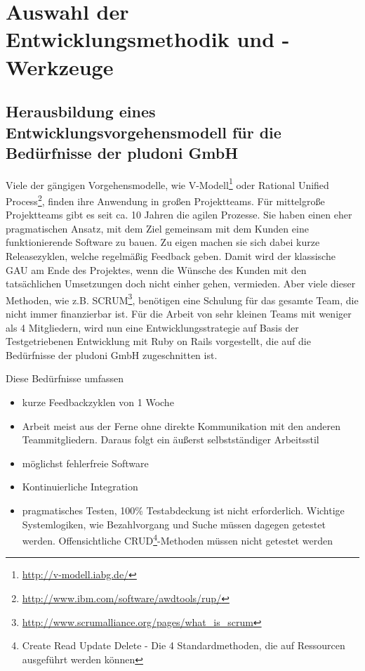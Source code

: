 \section{Auswahl der Entwicklungsmethodik und -Werkzeuge}
\subsection{Herausbildung eines Entwicklungsvorgehensmodell für die Bedürfnisse der pludoni GmbH}
Viele der gängigen Vorgehensmodelle, wie V-Modell\footnote{\url{http://v-modell.iabg.de/}} oder Rational Unified Process\footnote{\url{http://www.ibm.com/software/awdtools/rup/}}, finden ihre Anwendung in großen Projektteams. Für mittelgroße Projektteams gibt es seit ca. 10 Jahren die agilen Prozesse. Sie haben einen eher pragmatischen Ansatz, mit dem Ziel gemeinsam mit dem Kunden eine funktionierende Software zu bauen. Zu eigen machen sie sich dabei kurze Releasezyklen, welche regelmäßig Feedback geben. Damit wird der klassische GAU am Ende des Projektes, wenn die Wünsche des Kunden mit den tatsächlichen Umsetzungen doch nicht einher gehen, vermieden. Aber viele dieser Methoden, wie z.B. SCRUM\footnote{\url{http://www.scrumalliance.org/pages/what_is_scrum}}, benötigen eine Schulung für das gesamte Team, die nicht immer finanzierbar ist.
Für die Arbeit von sehr kleinen Teams mit weniger als 4 Mitgliedern, wird nun eine Entwicklungsstrategie auf Basis der Testgetriebenen Entwicklung mit Ruby on Rails vorgestellt, die auf die Bedürfnisse der pludoni GmbH zugeschnitten ist.

Diese Bedürfnisse umfassen
\begin{itemize}
 \item kurze Feedbackzyklen von 1 Woche
 \item Arbeit meist aus der Ferne ohne direkte Kommunikation mit den anderen Teammitgliedern. Daraus folgt ein äußerst selbstständiger Arbeitsstil
 \item möglichst fehlerfreie Software
 \item Kontinuierliche Integration
 \item pragmatisches Testen, 100\% Testabdeckung ist nicht erforderlich. Wichtige Systemlogiken, wie Bezahlvorgang und Suche müssen dagegen getestet werden. Offensichtliche CRUD\footnote{Create Read Update Delete - Die 4 Standardmethoden, die auf Ressourcen ausgeführt werden können}-Methoden müssen nicht getestet werden

\end{itemize}

